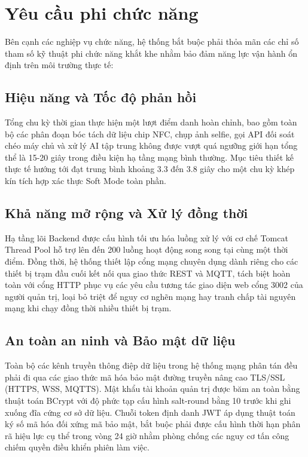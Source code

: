 ﻿\documentclass[../DoAn.tex]{subfiles}
\begin{document}
\section{Yêu cầu phi chức năng}
\label{section:2.4}

Bên cạnh các nghiệp vụ chức năng, hệ thống bắt buộc phải thỏa mãn các chỉ số tham số kỹ thuật phi chức năng khắt khe nhằm bảo đảm năng lực vận hành ổn định trên môi trường thực tế:

\subsection{Hiệu năng và Tốc độ phản hồi}
Tổng chu kỳ thời gian thực hiện một lượt điểm danh hoàn chỉnh, bao gồm toàn bộ các phân đoạn bóc tách dữ liệu chip NFC, chụp ảnh selfie, gọi API đối soát chéo máy chủ và xử lý AI tập trung không được vượt quá ngưỡng giới hạn tổng thể là 15-20 giây trong điều kiện hạ tầng mạng bình thường. Mục tiêu thiết kế thực tế hướng tới đạt trung bình khoảng 3.3 đến 3.8 giây cho một chu kỳ khép kín tích hợp xác thực Soft Mode toàn phần.

\subsection{Khả năng mở rộng và Xử lý đồng thời}
Hạ tầng lõi Backend được cấu hình tối ưu hóa luồng xử lý với cơ chế Tomcat Thread Pool hỗ trợ lên đến 200 luồng hoạt động song song tại cùng một thời điểm. Đồng thời, hệ thống thiết lập cổng mạng chuyên dụng dành riêng cho các thiết bị trạm đầu cuối kết nối qua giao thức REST và MQTT, tách biệt hoàn toàn với cổng HTTP phục vụ các yêu cầu tương tác giao diện web cổng 3002 của người quản trị, loại bỏ triệt để nguy cơ nghẽn mạng hay tranh chấp tài nguyên mạng khi chạy đồng thời nhiều thiết bị trạm.

\subsection{An toàn an ninh và Bảo mật dữ liệu}
Toàn bộ các kênh truyền thông điệp dữ liệu trong hệ thống mạng phân tán đều phải đi qua các giao thức mã hóa bảo mật đường truyền nâng cao TLS/SSL (HTTPS, WSS, MQTTS). Mật khẩu tài khoản quản trị được băm an toàn bằng thuật toán BCrypt với độ phức tạp cấu hình salt-round bằng 10 trước khi ghi xuống đĩa cứng cơ sở dữ liệu. Chuỗi token định danh JWT áp dụng thuật toán ký số mã hóa đối xứng mã bảo mật, bắt buộc phải được cấu hình thời hạn phân rã hiệu lực cụ thể trong vòng 24 giờ nhằm phòng chống các nguy cơ tấn công chiếm quyền điều khiển phiên làm việc.
\end{document}
